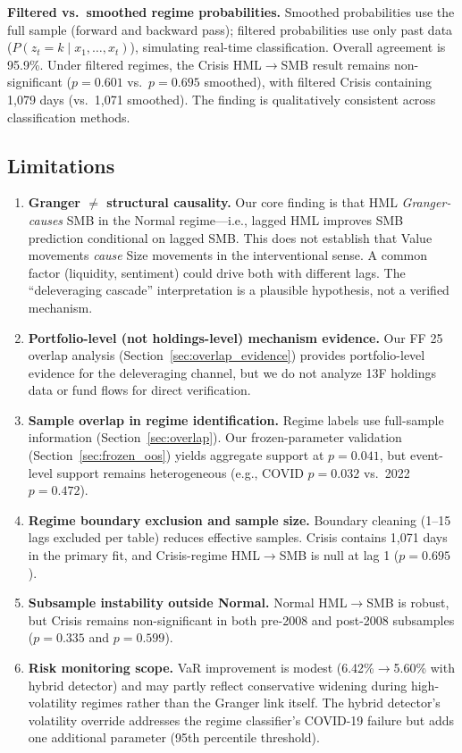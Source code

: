 \documentclass{uai2026}
\begin{document}
\textbf{Filtered vs.\ smoothed regime probabilities.} Smoothed probabilities use
the full sample (forward and backward pass); filtered probabilities use only past
data ($P(z_t = k \mid x_1, \ldots, x_t)$), simulating real-time classification.
Overall agreement is 95.9\%. Under filtered regimes, the Crisis HML$\to$SMB
result remains non-significant ($p = 0.601$ vs.\ $p = 0.695$ smoothed),
with filtered Crisis containing 1,079 days (vs.\ 1,071 smoothed).
The finding is qualitatively consistent across classification methods.

\subsection{Limitations}
\label{sec:limitations}

\begin{enumerate}
    \item \textbf{Granger $\neq$ structural causality.} Our core finding is that
    HML \emph{Granger-causes} SMB in the Normal regime---i.e., lagged HML improves SMB
    prediction conditional on lagged SMB. This does not establish that Value
    movements \emph{cause} Size movements in the interventional sense. A common
    factor (liquidity, sentiment) could drive both with different lags. The
    ``deleveraging cascade'' interpretation is a plausible hypothesis, not a verified
    mechanism.

    \item \textbf{Portfolio-level (not holdings-level) mechanism evidence.}
    Our FF 25 overlap analysis (Section~\ref{sec:overlap_evidence}) provides
    portfolio-level evidence for the deleveraging channel, but we do not analyze
    13F holdings data or fund flows for direct verification.

    \item \textbf{Sample overlap in regime identification.} Regime labels use full-sample
    information (Section~\ref{sec:overlap}). Our frozen-parameter validation
    (Section~\ref{sec:frozen_oos}) yields aggregate support at $p = 0.041$, but
    event-level support remains heterogeneous (e.g., COVID $p = 0.032$ vs.\ 2022
    $p = 0.472$).

    \item \textbf{Regime boundary exclusion and sample size.} Boundary cleaning
    (1--15 lags excluded per table) reduces effective samples. Crisis contains
    1,071 days in the primary fit, and Crisis-regime HML$\to$SMB is null at
    lag 1 ($p = 0.695$).

    \item \textbf{Subsample instability outside Normal.} Normal HML$\to$SMB
    is robust, but Crisis remains non-significant in both pre-2008 and
    post-2008 subsamples ($p = 0.335$ and $p = 0.599$).

    \item \textbf{Risk monitoring scope.} VaR improvement is modest
    (6.42\%$\to$5.60\% with hybrid detector) and may partly reflect
    conservative widening during high-volatility regimes rather than
    the Granger link itself. The hybrid detector's volatility override
    addresses the regime classifier's COVID-19 failure but adds one
    additional parameter (95th percentile threshold).
\end{enumerate}
\end{document}
